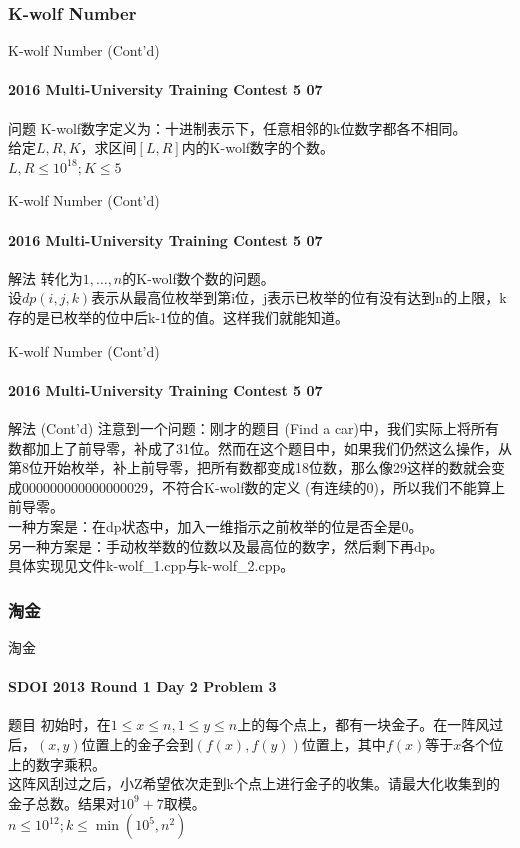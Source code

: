 \documentclass[hyperref={unicode=true}]{beamer}
\theoremstyle{definition}
\theoremstyle{proof}
\begin{document}
\subsubsection{K-wolf Number}
\begin{frame}{K-wolf Number (Cont'd)}\framesubtitle{2016 Multi-University Training Contest 5 07}
  \begin{block}{问题}
    K-wolf数字定义为：十进制表示下，任意相邻的k位数字都各不相同。\\
    给定$L,R,K$，求区间$[L,R]$内的K-wolf数字的个数。\\
    $L,R\leq10^{18};K\leq5$
  \end{block}
\end{frame}

\begin{frame}{K-wolf Number (Cont'd)}\framesubtitle{2016 Multi-University Training Contest 5 07}
  \begin{exampleblock}{解法}
    转化为$1,\ldots,n$的K-wolf数个数的问题。\\
    设$dp(i,j,k)$表示从最高位枚举到第i位，j表示已枚举的位有没有达到n的上限，k存的是已枚举的位中后k-1位的值。这样我们就能知道。\\
  \end{exampleblock}
\end{frame}

\begin{frame}{K-wolf Number (Cont'd)}\framesubtitle{2016 Multi-University Training Contest 5 07}
  \begin{exampleblock}{解法 (Cont'd)}
    注意到一个问题：刚才的题目 (Find a car)中，我们实际上将所有数都加上了前导零，补成了31位。然而在这个题目中，如果我们仍然这么操作，从第8位开始枚举，补上前导零，把所有数都变成18位数，那么像29这样的数就会变成000000000000000029，不符合K-wolf数的定义 (有连续的0)，所以我们不能算上前导零。\\
    \pause{}一种方案是：在dp状态中，加入一维指示之前枚举的位是否全是0。\\
    另一种方案是：手动枚举数的位数以及最高位的数字，然后剩下再dp。\\
    \pause{}具体实现见文件k-wolf\_1.cpp与k-wolf\_2.cpp。
  \end{exampleblock}
\end{frame}

\subsubsection{淘金}
\begin{frame}{淘金}\framesubtitle{SDOI 2013 Round 1 Day 2 Problem 3}
  \begin{block}{题目}
    初始时，在$1 \leq x \leq n, 1 \leq y \leq n$上的每个点上，都有一块金子。在一阵风过后，$(x,y)$位置上的金子会到$(f(x),f(y))$位置上，其中$f(x)$等于$x$各个位上的数字乘积。\\
    这阵风刮过之后，小Z希望依次走到k个点上进行金子的收集。请最大化收集到的金子总数。结果对$10^9+7$取模。\\
    $n\leq 10^{12};k \leq \min(10^5, n^2)$
  \end{block}
\end{frame}
\end{document}
